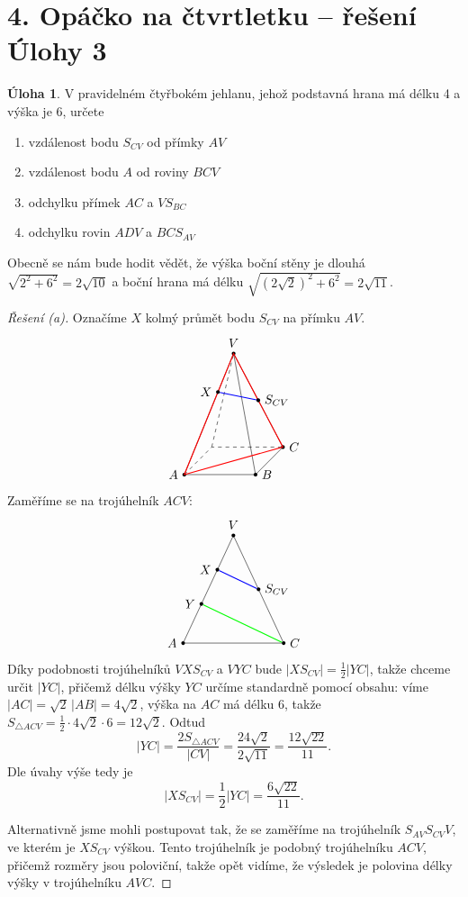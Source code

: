 \documentclass[10pt,a4paper]{extarticle}
\def\bod#1#2#3{\node[circle,fill=black,inner sep=0pt,outer sep=0pt,minimum size=3pt,label=#2:{$#3$}] (#3) at (#1) {};}
\def\zaklad{%
\draw[dashed] (0,0,1) -- (0,0,0) -- (1,0,0);%
\draw (1,0,0)-- (1,0,1) -- (0,0,1);
\draw (1,0,0) -- (.5,1.5,.5) -- (1,0,1);
\draw (0,0,1) -- (.5,1.5,.5);
\draw[dashed] (0,0,0) -- (.5,1.5,.5);
\bod{1,0,0}{right}{C}
\bod{1,0,1}{right}{B}
\bod{0,0,1}{left}{A}
\bod{.5,1.5,.5}{above}{V}
}
\theoremstyle{definition}
\newtheorem{uloha}{Úloha}
\begin{document}
\section*{4. Opáčko na čtvrtletku -- řešení Úlohy 3}

\setcounter{uloha}{2}

\begin{uloha}
V pravidelném čtyřbokém jehlanu, jehož podstavná hrana má délku 4 a výška je 6, určete
\begin{enumerate}
    \item vzdálenost bodu $S_{CV}$ od přímky $AV$ %
    \item vzdálenost bodu $A$ od roviny $BCV$
    \item odchylku přímek $AC$ a $VS_{BC}$ %
    \item odchylku rovin $ADV$ a $BCS_{AV}$ %
\end{enumerate}
\end{uloha}

Obecně se nám bude hodit vědět, že výška boční stěny je dlouhá $\sqrt{2^2+6^2} = 2\sqrt{10}$ a boční hrana má délku $\sqrt{(2\sqrt2)^2 + 6^2} = 2\sqrt{11}$.


\begin{proof}[Řešení (a)]
Označíme $X$ kolmý průmět bodu $S_{CV}$ na přímku $AV$.
\[\begin{tikzpicture}[scale=2]
    \zaklad
    \draw[red, thick] (A.center) -- (C.center) -- (V.center) -- cycle;
    \bod{.75,.75,.25}{right}{S_{CV}}
    \bod{.341,1.023,.659}{left}{X}
    \draw[blue, thick] (S_{CV}) -- (X);
\end{tikzpicture}  \]
Zaměříme se na trojúhelník $ACV$:
\[\begin{tikzpicture}[scale=.5]
    \bod{-2.828,0}{left}{A}
    \bod{2.828,0}{right}{C}
    \bod{0,6}{above}{V}
    \draw (A) -- (C) -- (V) -- (A);
    \bod{1.414,3}{right}{S_{CV}}
    \bod{-.9,4.091}{left}{X}
    \draw[blue, thick] (S_{CV}) -- (X);
    \bod{-1.8,2.182}{left}{Y}
    \draw[green, thick] (C) -- (Y);
\end{tikzpicture}\]
Díky podobnosti trojúhelníků $VXS_{CV}$ a $VYC$ bude $|XS_{CV}| = \frac12|YC|$, takže chceme určit $|YC|$, přičemž délku výšky $YC$ určíme standardně pomocí obsahu: víme $|AC| = \sqrt2\, |AB| = 4\sqrt2$, výška na $AC$ má délku $6$, takže $S_{\triangle ACV} = \frac12 \cdot 4\sqrt2 \cdot 6 = 12\sqrt2$. Odtud
\[ |YC| = \frac{2S_{\triangle ACV}}{|CV|} = \frac{24\sqrt2}{2\sqrt{11}} = \frac{12\sqrt{22}}{11}. \]
Dle úvahy výše tedy je
\[ |XS_{CV}| = \frac12|YC| = \frac{6\sqrt{22}}{11}. \]

Alternativně jsme mohli postupovat tak, že se zaměříme na trojúhelník $S_{AV}S_{CV}V$, ve kterém je $XS_{CV}$ výškou. Tento trojúhelník je podobný trojúhelníku $ACV$, přičemž rozměry jsou poloviční, takže opět vidíme, že výsledek je polovina délky výšky v trojúhelníku $AVC$.
\end{proof}
\end{document}
